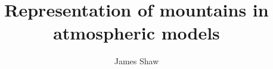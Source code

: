 \documentclass[a4paper,twoside,draft]{report}
\begin{document}
\title{Representation of mountains in atmospheric models}
\author{James Shaw}
\date{}
\maketitle

\begin{abstract}
\end{abstract}

\tableofcontents

\printbibliography
\end{document}
